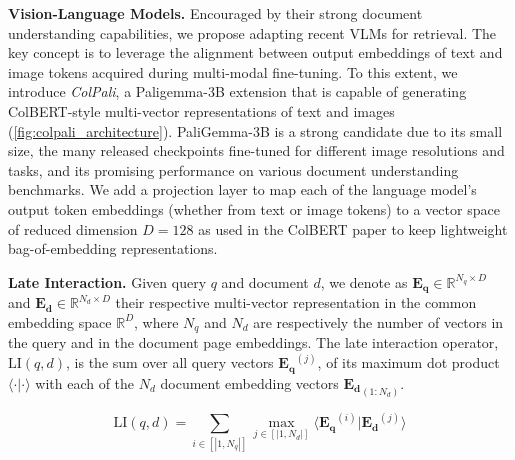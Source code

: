 \textbf{Vision-Language Models.}
Encouraged by their strong document understanding capabilities, we propose adapting recent VLMs for retrieval. The key concept is to leverage the alignment between output embeddings of text and image tokens acquired during multi-modal fine-tuning. 
To this extent, we introduce \textit{ColPali}, a Paligemma-3B extension that is capable of generating ColBERT-style multi-vector representations of text and images (\autoref{fig:colpali_architecture}).
PaliGemma-3B is a strong candidate due to its small size, the many released checkpoints fine-tuned for different image resolutions and tasks, and its promising performance on various document understanding benchmarks.
We add a projection layer to map each of the language model's output token embeddings (whether from text or image tokens)  to a vector space of reduced dimension $D = 128$ as used in the ColBERT paper  to keep lightweight bag-of-embedding representations.


\noindent\textbf{Late Interaction.}
Given query $q$ and document $d$, we denote as $\mathbf{E_q} \in \mathbb{R}^{{N_q} \times D}$ and $\mathbf{E_d} \in \mathbb{R}^{N_d \times D}$ their respective multi-vector representation in the common embedding space $\mathbb{R}^D$, where $N_q$ and $N_d$ are respectively the number of vectors in the query and in the document page embeddings. The late interaction operator, $\text{LI} \left( q, d \right)$, is the sum over all query vectors $\mathbf{E_{q}}^{(j)}$, of its maximum dot product $\langle \cdot | \cdot \rangle$ with each of the $N_d$ document embedding vectors $\mathbf{E_d}_{(1:N_d)}$.

\begin{equation}
    \text{LI} \left( q, d \right) = \sum_{i \in [|1, N_q|]} \max_{j \in [|1, N_d|]} \langle \mathbf{E_{q}}^{(i)} | \mathbf{E_{d}}^{(j)} \rangle
\label{eq:colbert_maxsim_score}
\end{equation}

